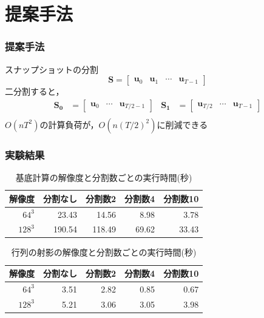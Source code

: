 \documentclass[aspectratio=169,dvipdfmx,hyperref={bookmarks=true}]{beamer}
\begin{document}
\section{提案手法}
\begin{frame}
\frametitle{提案手法}
\begin{block}{スナップショットの分割}
 \[ \bm{S} = 
        		\begin{bmatrix}
   \bm{u}_0 & \bm{u}_1 &\cdots  & \bm{u}_{T-1}
\end{bmatrix}
\]
二分割すると，
\begin{align*}
	\bm{S_0} 		&= \begin{bmatrix}\bm{u}_0 &\cdots  & \bm{u}_{T/2-1}\end{bmatrix}		&\bm{S_1} 	&= \begin{bmatrix} \bm{u}_{T/2}  &\cdots  & \bm{u}_{T-1}\end{bmatrix}\\
\end{align*}
$O(nT^2)$の計算負荷が，$O(n(T/2)^2)$に削減できる
\end{block}
 \end{frame}

 \begin{frame}
 \frametitle{実験結果}
 \begin {table}[htbp]
    \centering
  \caption{基底計算の解像度と分割数ごとの実行時間(秒)}
  \label{tab:basis}
  \begin {tabular}{rrrrr} \hline
    \multicolumn{1}{c}{解像度} 					&\multicolumn{1}{c}{分割なし} 		&\multicolumn{1}{c}{分割数2}			&\multicolumn{1}{c}{分割数4} 		&\multicolumn{1}{c}{分割数10}\\ \hline
    $64^3$ 					& 23.43 			&14.56	 		&8.98	 	&3.78\\
    $128^3$ 				& 190.54 			&118.49 			& 69.62 		&33.43\\ \hline
  \end {tabular}
\end {table}

\begin {table}[htbp]
    \centering
  \caption{行列の射影の解像度と分割数ごとの実行時間(秒)}
  \label{tab:projection}
  \begin {tabular}{rrrrr} \hline
    \multicolumn{1}{c}{解像度} 					&\multicolumn{1}{c}{分割なし} 		&\multicolumn{1}{c}{分割数2}			&\multicolumn{1}{c}{分割数4} 		&\multicolumn{1}{c}{分割数10}\\ \hline
    $64^3$ 					& 3.51 			&2.82	 		&0.85	 		&0.67\\
    $128^3$ 				& 5.21 			& 3.06 			& 3.05 			&3.98\\ \hline
  \end {tabular}
\end {table}
\end{frame}
\end{document}
